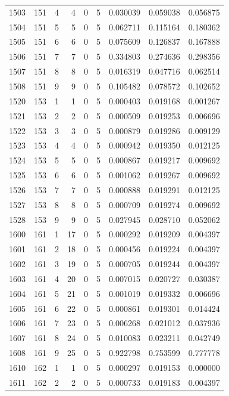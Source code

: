 \begin{longtable}{rrrrrrrrr}
1503 & 151 & 4 & 4 & 0 & 5 & 0.030039 & 0.059038 & 0.056875 \\
1504 & 151 & 5 & 5 & 0 & 5 & 0.062711 & 0.115164 & 0.180362 \\
1505 & 151 & 6 & 6 & 0 & 5 & 0.075609 & 0.126837 & 0.167888 \\
1506 & 151 & 7 & 7 & 0 & 5 & 0.334803 & 0.274636 & 0.298356 \\
1507 & 151 & 8 & 8 & 0 & 5 & 0.016319 & 0.047716 & 0.062514 \\
1508 & 151 & 9 & 9 & 0 & 5 & 0.105482 & 0.078572 & 0.102652 \\
1520 & 153 & 1 & 1 & 0 & 5 & 0.000403 & 0.019168 & 0.001267 \\
1521 & 153 & 2 & 2 & 0 & 5 & 0.000509 & 0.019253 & 0.006696 \\
1522 & 153 & 3 & 3 & 0 & 5 & 0.000879 & 0.019286 & 0.009129 \\
1523 & 153 & 4 & 4 & 0 & 5 & 0.000942 & 0.019350 & 0.012125 \\
1524 & 153 & 5 & 5 & 0 & 5 & 0.000867 & 0.019217 & 0.009692 \\
1525 & 153 & 6 & 6 & 0 & 5 & 0.001062 & 0.019267 & 0.009692 \\
1526 & 153 & 7 & 7 & 0 & 5 & 0.000888 & 0.019291 & 0.012125 \\
1527 & 153 & 8 & 8 & 0 & 5 & 0.000709 & 0.019274 & 0.009692 \\
1528 & 153 & 9 & 9 & 0 & 5 & 0.027945 & 0.028710 & 0.052062 \\
1600 & 161 & 1 & 17 & 0 & 5 & 0.000292 & 0.019209 & 0.004397 \\
1601 & 161 & 2 & 18 & 0 & 5 & 0.000456 & 0.019224 & 0.004397 \\
1602 & 161 & 3 & 19 & 0 & 5 & 0.000705 & 0.019244 & 0.004397 \\
1603 & 161 & 4 & 20 & 0 & 5 & 0.007015 & 0.020727 & 0.030387 \\
1604 & 161 & 5 & 21 & 0 & 5 & 0.001019 & 0.019332 & 0.006696 \\
1605 & 161 & 6 & 22 & 0 & 5 & 0.000861 & 0.019301 & 0.014424 \\
1606 & 161 & 7 & 23 & 0 & 5 & 0.006268 & 0.021012 & 0.037936 \\
1607 & 161 & 8 & 24 & 0 & 5 & 0.010083 & 0.023211 & 0.042749 \\
1608 & 161 & 9 & 25 & 0 & 5 & 0.922798 & 0.753599 & 0.777778 \\
1610 & 162 & 1 & 1 & 0 & 5 & 0.000297 & 0.019153 & 0.000000 \\
1611 & 162 & 2 & 2 & 0 & 5 & 0.000733 & 0.019183 & 0.004397 \\

\end{longtable}
